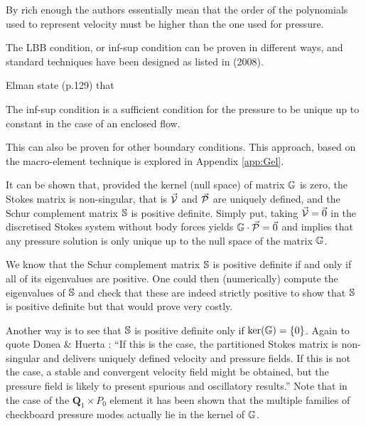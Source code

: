 By rich enough the authors essentially mean that 
the order of the polynomials used to represent velocity must be higher than the one used 
for pressure.

The LBB condition, or inf-sup condition can be proven in different ways, 
and standard techniques have been designed
as listed in \textcite{bobf08} (2008).


Elman \etal \cite{elsw} state (p.129) that 
\begin{displayquote}
{\color{darkgray}
The inf-sup condition is a sufficient condition 
for the pressure to be unique up to constant in the case of an enclosed flow.
}
\end{displayquote}
This can also be proven for other boundary conditions.
This approach, based on the macro-element technique \cite{sten90} is explored in Appendix \ref{app:Gel}.

It can be shown that, provided the kernel (null space) of matrix ${\mathbb{G}}$ is zero,
the Stokes matrix is non-singular, that is $\vec{\cal V}$ and $\vec{\cal P}$ 
are uniquely defined, and the Schur complement matrix ${\mathbb{S}}$ is positive definite. 
Simply put, taking $\vec{\cal V}=\vec{0}$ in the discretised Stokes system 
without body forces yields ${\mathbb{G}} \cdot \vec{\cal P}=\vec{0}$ and implies
that any pressure solution is only unique up to the null space of the matrix ${\mathbb{G}}$.

We know that the Schur complement matrix ${\mathbb{S}}$ is positive definite if and only if all of its eigenvalues are positive.
One could then (numerically) compute the eigenvalues of ${\mathbb{S}}$ and check that these are indeed strictly positive
to show that ${\mathbb{S}}$ is positive definite but that would prove very costly. 

Another way is to see that ${\mathbb{S}}$ is positive definite only if $\text{ker}({\mathbb{G}})=\{0\}$.
Again to quote Donea \& Huerta \cite{dohu03}: ``If this is the case, the partitioned Stokes matrix  
is non-singular and delivers uniquely defined velocity and pressure fields. If this is not the case, a
stable and convergent velocity field might be obtained, but the pressure field is likely
to present spurious and oscillatory results.'' 
Note that in the case of the ${\bm Q}_1 \times P_0$ element it has been shown that the multiple families of 
checkboard pressure modes actually lie in the kernel of ${\mathbb{G}}$. \cite{sagl81a,sagl81b}

\hspace{.4cm}

